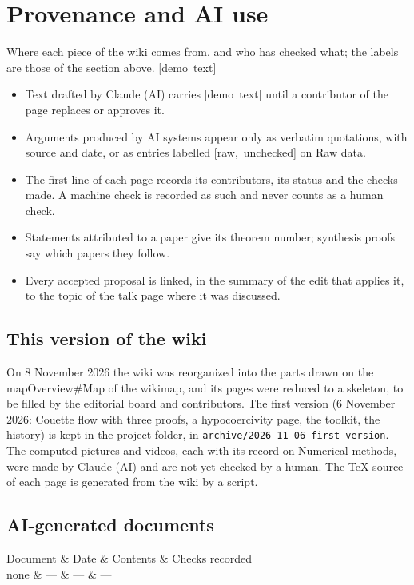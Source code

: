 \documentclass[11pt]{article}
\makeatletter
\theoremstyle{definition}
\theoremstyle{remark}
\newcommand{\ed@label}[1]{\mbox{\footnotesize[#1]}}
\newcommand{\demo}[1]{\ed@label{demo text}}
\newcommand{\raw}[1]{\ed@label{raw, unchecked}}
\newcommand{\wikilink}[2]{\ifx\relax#2\relax#1\else#2\fi}
\newenvironment{wikitable}[1]{\par\smallskip\noindent\tabularx{\linewidth}{|*{#1}{>{\raggedright\arraybackslash}X|}}\hline}{\endtabularx\par\smallskip}
\newcommand{\header}[1]{#1\\\hline\hline}
\newcommand{\row}[1]{#1\\\hline}
\makeatother
\begin{document}
\section{Provenance and AI use}
Where each piece of the wiki comes from, and who has checked what; the labels are those of the section above. \demo{}
\begin{itemize}
  \item Text drafted by Claude (AI) carries \demo{} until a contributor of the page replaces or approves it.
  \item Arguments produced by AI systems appear only as verbatim quotations, with source and date, or as entries labelled \raw{} on \wikilink{Raw data}{}.
  \item The first line of each page records its contributors, its status and the checks made. A machine check is recorded as such and never counts as a human check.
  \item Statements attributed to a paper give its theorem number; synthesis proofs say which papers they follow.
  \item Every accepted proposal is linked, in the summary of the edit that applies it, to the topic of the talk page where it was discussed.
\end{itemize}

\subsection{This version of the wiki}
On 8 November 2026 the wiki was reorganized into the parts drawn on the \wikilink{Overview\#Map of the wiki}{map}, and its pages were reduced to a skeleton, to be filled by the editorial board and contributors. The first version (6 November 2026: Couette flow with three proofs, a hypocoercivity page, the toolkit, the history) is kept in the project folder, in \texttt{archive/2026-11-06-first-version}. The computed pictures and videos, each with its record on \wikilink{Numerical methods}{}, were made by Claude (AI) and are not yet checked by a human. The TeX source of each page is generated from the wiki by a script.

\subsection{AI-generated documents}
\begin{wikitable}{4}
\header{Document & Date & Contents & Checks recorded}
\row{none & — & — & —}
\end{wikitable}
\end{document}
